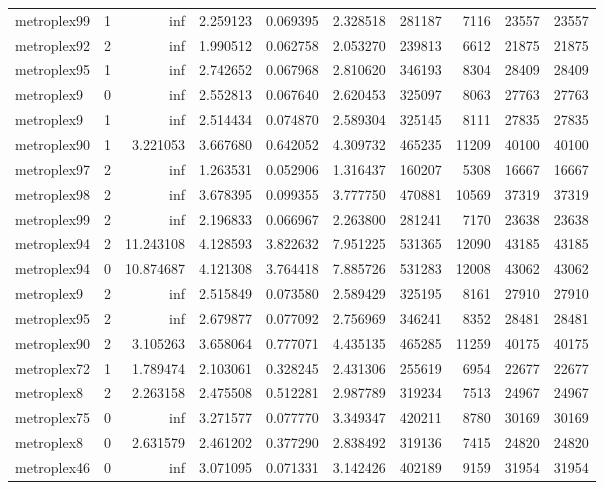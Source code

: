 \begin{longtable}{|l|r|r|r|r|r|r|r|r|r|}
metroplex99 & 1 & inf & 2.259123 & 0.069395 & 2.328518 & 281187 & 7116 & 23557 & 23557 \\
metroplex92 & 2 & inf & 1.990512 & 0.062758 & 2.053270 & 239813 & 6612 & 21875 & 21875 \\
metroplex95 & 1 & inf & 2.742652 & 0.067968 & 2.810620 & 346193 & 8304 & 28409 & 28409 \\
metroplex9 & 0 & inf & 2.552813 & 0.067640 & 2.620453 & 325097 & 8063 & 27763 & 27763 \\
metroplex9 & 1 & inf & 2.514434 & 0.074870 & 2.589304 & 325145 & 8111 & 27835 & 27835 \\
metroplex90 & 1 & 3.221053 & 3.667680 & 0.642052 & 4.309732 & 465235 & 11209 & 40100 & 40100 \\
metroplex97 & 2 & inf & 1.263531 & 0.052906 & 1.316437 & 160207 & 5308 & 16667 & 16667 \\
metroplex98 & 2 & inf & 3.678395 & 0.099355 & 3.777750 & 470881 & 10569 & 37319 & 37319 \\
metroplex99 & 2 & inf & 2.196833 & 0.066967 & 2.263800 & 281241 & 7170 & 23638 & 23638 \\
metroplex94 & 2 & 11.243108 & 4.128593 & 3.822632 & 7.951225 & 531365 & 12090 & 43185 & 43185 \\
metroplex94 & 0 & 10.874687 & 4.121308 & 3.764418 & 7.885726 & 531283 & 12008 & 43062 & 43062 \\
metroplex9 & 2 & inf & 2.515849 & 0.073580 & 2.589429 & 325195 & 8161 & 27910 & 27910 \\
metroplex95 & 2 & inf & 2.679877 & 0.077092 & 2.756969 & 346241 & 8352 & 28481 & 28481 \\
metroplex90 & 2 & 3.105263 & 3.658064 & 0.777071 & 4.435135 & 465285 & 11259 & 40175 & 40175 \\
metroplex72 & 1 & 1.789474 & 2.103061 & 0.328245 & 2.431306 & 255619 & 6954 & 22677 & 22677 \\
metroplex8 & 2 & 2.263158 & 2.475508 & 0.512281 & 2.987789 & 319234 & 7513 & 24967 & 24967 \\
metroplex75 & 0 & inf & 3.271577 & 0.077770 & 3.349347 & 420211 & 8780 & 30169 & 30169 \\
metroplex8 & 0 & 2.631579 & 2.461202 & 0.377290 & 2.838492 & 319136 & 7415 & 24820 & 24820 \\
metroplex46 & 0 & inf & 3.071095 & 0.071331 & 3.142426 & 402189 & 9159 & 31954 & 31954 \\
\end{longtable}
